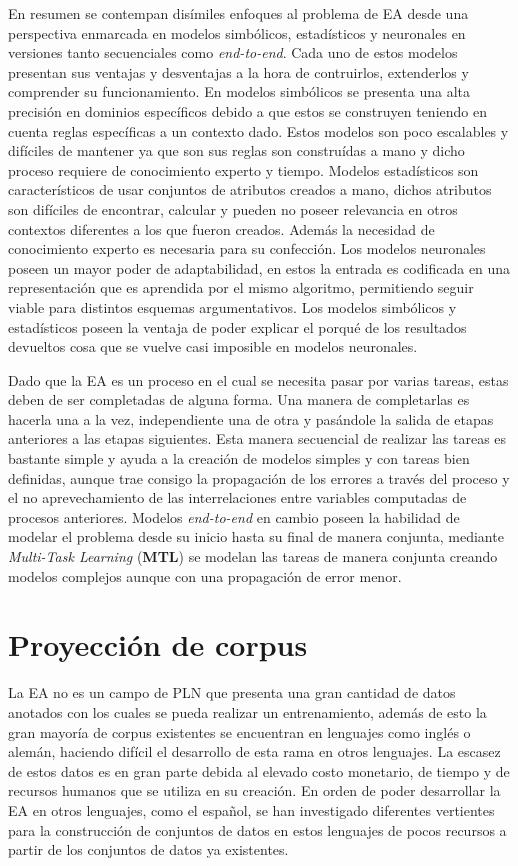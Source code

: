 En resumen se contempan disímiles enfoques al problema de EA desde una perspectiva enmarcada en modelos 
simbólicos, estadísticos y neuronales en versiones tanto secuenciales como \emph{end-to-end}. 
Cada uno de estos modelos presentan sus ventajas y desventajas a la hora de contruirlos, 
extenderlos y comprender su funcionamiento. En modelos simbólicos se presenta una alta
precisión en dominios específicos debido a que estos se construyen teniendo en cuenta reglas específicas a un
contexto dado. Estos modelos son poco escalables y difíciles de mantener ya que son sus reglas son construídas
a mano y dicho proceso requiere de conocimiento experto y tiempo. Modelos estadísticos son
característicos de usar conjuntos de atributos creados a mano, dichos atributos son difíciles
de encontrar, calcular y pueden no poseer relevancia en otros contextos diferentes a los que fueron creados. 
Además la necesidad de conocimiento experto es necesaria para su confección. Los modelos neuronales poseen
un mayor poder de adaptabilidad, en estos la entrada es codificada en una representación que es aprendida por
el mismo algoritmo, permitiendo seguir viable para distintos esquemas argumentativos. Los modelos simbólicos y 
estadísticos poseen la ventaja de poder explicar el porqué de los resultados devueltos cosa que se vuelve casi
imposible en modelos neuronales.

Dado que la EA es un proceso en el cual se necesita pasar por varias tareas, estas deben de ser completadas
de alguna forma. Una manera de completarlas es hacerla una a la vez, independiente una de otra y pasándole
la salida de etapas anteriores a las etapas siguientes. Esta manera secuencial de realizar las 
tareas es bastante simple y ayuda a la creación de modelos simples y con tareas bien definidas, aunque trae consigo 
la propagación de los errores a través del proceso y el no aprevechamiento de las interrelaciones entre variables 
computadas de procesos anteriores. Modelos \emph{end-to-end} en cambio poseen la habilidad de modelar el problema 
desde su inicio hasta su final de manera conjunta, mediante \emph{Multi-Task Learning} (\textbf{MTL}) se modelan
las tareas de manera conjunta creando modelos complejos aunque con una propagación de error menor.

\section{Proyección de corpus}

La EA no es un campo de PLN que presenta una gran cantidad de datos anotados con los cuales se pueda realizar 
un entrenamiento, además de esto la gran mayoría de corpus existentes se encuentran en lenguajes como inglés o alemán,
haciendo difícil el desarrollo de esta rama en otros lenguajes.
La escasez de estos datos es en gran parte debida al elevado costo monetario, de tiempo y de recursos humanos que se utiliza
en su creación. En orden de poder desarrollar la EA en otros lenguajes, como el español, se han investigado diferentes vertientes
para la construcción de conjuntos de datos en estos lenguajes de pocos recursos a partir de los conjuntos de datos ya 
existentes.

